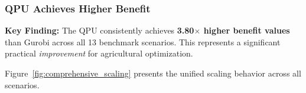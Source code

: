 

\subsubsection{QPU Achieves Higher Benefit}

\textbf{Key Finding:} The QPU consistently achieves \textbf{3.80$\times$ higher benefit values} than Gurobi across all 13 benchmark scenarios. This represents a significant practical \textit{improvement} for agricultural optimization.

Figure~\ref{fig:comprehensive_scaling} presents the unified scaling behavior across all scenarios.

